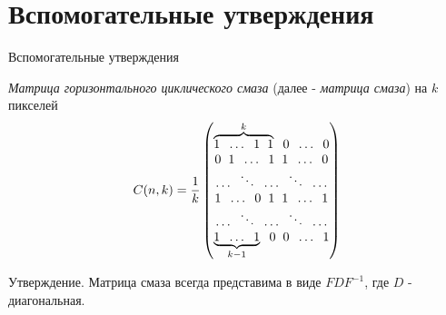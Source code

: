 \documentclass[10pt]{beamer}
\begin{document}
\section{Вспомогательные утверждения}
\begin{frame}{Вспомогательные утверждения}
\begin{block}{\emph{Матрица горизонтального циклического смаза} (далее - \emph{матрица смаза}) на $k$ пикселей}
    $$
    C(n, k) = \frac{1}{k}\begin{pmatrix}
          \overbrace{1 \hspace*{2mm} \ldots \hspace*{2mm} 1 \hspace*{2mm} 1}^{k} \hspace*{2mm} 0 \hspace*{2mm} \ldots \hspace*{2mm} 0 \\
          0 \hspace*{2mm} 1 \hspace*{2mm} \ldots \hspace*{2mm} 1 \hspace*{2mm} 1 \hspace*{2mm} \ldots \hspace*{2mm} 0 \\
          \ldots \hspace*{2mm} \ddots \hspace*{2mm} \ldots \hspace*{2mm} \ddots \hspace*{2mm} \ldots \\
          1 \hspace*{2mm} \ldots \hspace*{2mm} 0 \hspace*{2mm} 1 \hspace*{2mm} 1 \hspace*{2mm} \ldots \hspace*{2mm} 1 \\
          \ldots \hspace*{2mm} \ddots \hspace*{2mm} \ldots \hspace*{2mm} \ddots \hspace*{2mm} \ldots\\
          \underbrace{1 \hspace*{2mm} \ldots \hspace*{2mm} 1}_{k-1} \hspace*{2mm} 0 \hspace*{2mm} 0 \hspace*{2mm} \ldots \hspace*{2mm} 1
        \end{pmatrix}
    $$
\end{block}

\begin{block}{Утверждение.}
 Матрица смаза всегда представима в виде $FDF^{-1}$, где $D$ - диагональная.
\end{block}

\end{frame}
\end{document}
